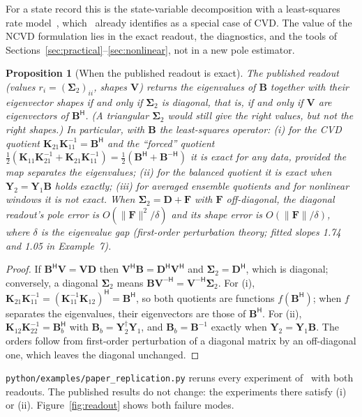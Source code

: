 \documentclass[report]{nld}
\newtheorem{proposition}{Proposition}
\theoremstyle{remark}\newtheorem*{remark}{Remark}
\newcommand{\B}{\mathbf{B}}
\newcommand{\V}{\mathbf{V}}
\newcommand{\Y}{\mathbf{Y}}
\newcommand{\K}{\mathbf{K}}
\newcommand{\Sg}{\symbf{\Sigma}}
\renewcommand{\H}{\mathsf{H}}
\newcommand{\code}[1]{\texttt{#1}}
\begin{document}
For a state record this is the state-variable decomposition with a
least-squares rate model~\cite{feeny2008}, which~\cite{li2025} already
identifies as a special case of CVD. The value of the NCVD formulation lies in
the exact readout, the diagnostics, and the tools of
Sections~\ref{sec:practical}--\ref{sec:nonlinear}, not in a new pole estimator.

\begin{proposition}[When the published readout is exact]\label{prop:exact}
The published readout (values $r_i=(\Sg_2)_{ii}$, shapes $\V$) returns the
eigenvalues of $\B$ together with their eigenvector shapes if and only if
$\Sg_2$ is diagonal, that is, if and only if $\V$ are eigenvectors of $\B^\H$.
(A triangular $\Sg_2$ would still give the right values, but not the right
shapes.) In particular, with $\B$ the least-squares operator:
(i) for the CVD quotient $\K_{21}\K_{11}^{-1}=\B^\H$ and the ``forced''
quotient $\tfrac12(\K_{11}\K_{21}^{-1}+\K_{21}\K_{11}^{-1})=\tfrac12(\B^\H+\B^{-\H})$
it is exact for any data, provided the map separates the eigenvalues;
(ii) for the balanced quotient it is exact when $\Y_2=\Y_1\B$ holds exactly;
(iii) for averaged ensemble quotients and for nonlinear windows it is not exact.
When $\Sg_2=\mathbf{D}+\mathbf{F}$ with $\mathbf{F}$ off-diagonal, the diagonal
readout's pole error is $O(\|\mathbf{F}\|^2/\delta)$ and its shape error is
$O(\|\mathbf{F}\|/\delta)$, where $\delta$ is the eigenvalue gap (first-order
perturbation theory; fitted slopes 1.74 and 1.05 in Example~7).
\end{proposition}

\begin{proof}
If $\B^\H\V=\V\mathbf{D}$ then $\V^\H\B=\mathbf{D}^\H\V^\H$ and $\Sg_2=\mathbf{D}^\H$,
which is diagonal; conversely, a diagonal $\Sg_2$ means $\B\V^{-\H}=\V^{-\H}\Sg_2$.
For (i), $\K_{21}\K_{11}^{-1}=(\K_{11}^{-1}\K_{12})^\H=\B^\H$, so both quotients are
functions $f(\B^\H)$; when $f$ separates the eigenvalues, their eigenvectors are
those of $\B^\H$. For (ii), $\K_{12}\K_{22}^{-1}=\B_b^\H$ with $\B_b=\Y_2^\dagger\Y_1$,
and $\B_b=\B^{-1}$ exactly when $\Y_2=\Y_1\B$. The orders follow from first-order
perturbation of a diagonal matrix by an off-diagonal one, which leaves the
diagonal unchanged.
\end{proof}

\code{python/examples/paper\_replication.py} reruns every experiment
of~\cite{li2025} with both readouts. The published results do not change: the
experiments there satisfy (i) or (ii). Figure~\ref{fig:readout} shows both
failure modes.
\end{document}
